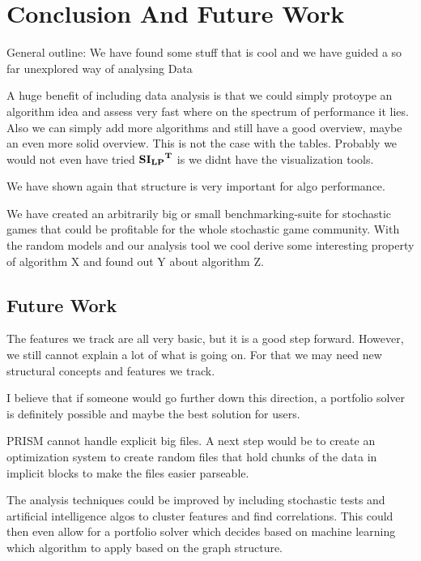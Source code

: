 \chapter{Conclusion And Future Work} \label{ch:conclusion}

General outline: We have found some stuff that is cool and we have guided a so far unexplored way of analysing Data

A huge benefit of including data analysis is that we could simply protoype an algorithm idea and assess very fast where on the spectrum of performance it lies.
Also we can simply add more algorithms and still have a good overview, maybe an even more solid overview. This is not the case with the tables.
Probably we would not even have tried $\mathbf{\mathbf{SI_{LP}}^T}$ is we didnt have the visualization tools.

We have shown again that structure is very important for algo performance.

We have created an arbitrarily big or small benchmarking-suite for stochastic games that could be profitable for the whole stochastic game community. 
With the random models and our analysis tool we cool derive some interesting property of algorithm X and found out Y about algorithm Z.

\section{Future Work}
The features we track are all very basic, but it is a good step forward. However, we still cannot explain a lot of what is going on. 
For that we may need new structural concepts and features we track.

I believe that if someone would go further down this direction, a portfolio solver is definitely possible and maybe the best solution for users.

PRISM cannot handle explicit big files.
A next step would be to create an optimization system to create random files that hold chunks of the data in implicit blocks to make the files easier parseable.

The analysis techniques could be improved by including stochastic tests and artificial intelligence algos to cluster features and find correlations.
This could then even allow for a portfolio solver which decides based on machine learning which algorithm to apply based on the graph structure.